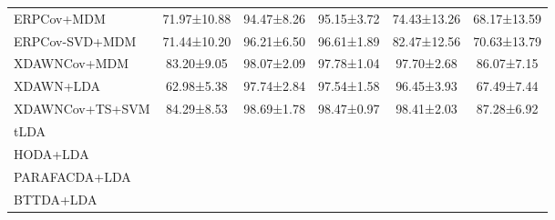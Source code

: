 \begin{tabularx}{\textwidth}{@{}Xccccc@{}}
\midrule
ERPCov+MDM            & 71.97±10.88 & 94.47±8.26 & 95.15±3.72 & 74.43±13.26 & 68.17±13.59 \\
ERPCov-SVD+MDM  & 71.44±10.20 & 96.21±6.50 & 96.61±1.89 & 82.47±12.56 & 70.63±13.79 \\
XDAWNCov+MDM          & 83.20±9.05 & 98.07±2.09 & 97.78±1.04 & 97.70±2.68 & 86.07±7.15 \\
XDAWN+LDA             & 62.98±5.38 & 97.74±2.84 & 97.54±1.58 & 96.45±3.93 & 67.49±7.44 \\
XDAWNCov+TS+SVM       & 84.29±8.53 & 98.69±1.78 & 98.47±0.97 & 98.41±2.03 & 87.28±6.92 \\
tLDA                  & & & & & \\ \midrule
HODA+LDA                  & & & & &  \\
PARAFACDA+LDA             & & & & &  \\
BTTDA+LDA                 & & & & &  \\
\bottomrule
\end{tabularx}
